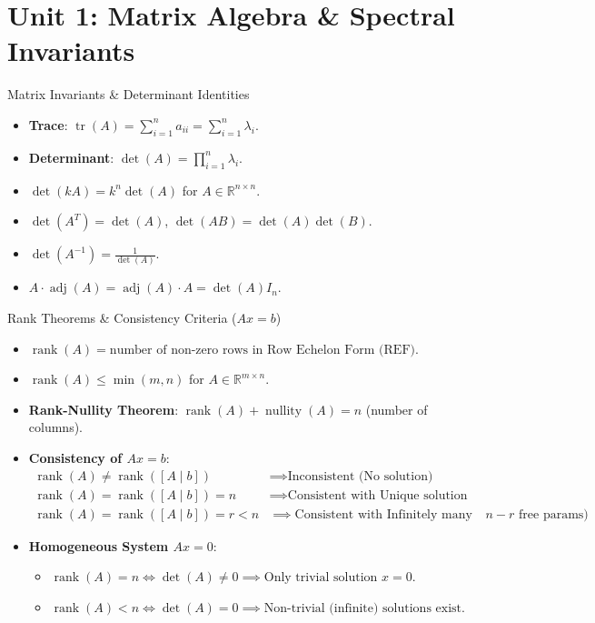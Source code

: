 \chapter{Unit 1: Matrix Algebra \& Spectral Invariants}

\begin{formulabox}{Matrix Invariants \& Determinant Identities}
\begin{itemize}
    \item \textbf{Trace}: $\operatorname{tr}(A) = \sum_{i=1}^n a_{ii} = \sum_{i=1}^n \lambda_i$.
    \item \textbf{Determinant}: $\det(A) = \prod_{i=1}^n \lambda_i$.
    \item $\det(kA) = k^n \det(A)$ for $A \in \mathbb{R}^{n \times n}$.
    \item $\det(A^T) = \det(A)$, $\det(AB) = \det(A)\det(B)$.
    \item $\det(A^{-1}) = \frac{1}{\det(A)}$.
    \item $A \cdot \operatorname{adj}(A) = \operatorname{adj}(A) \cdot A = \det(A) I_n$.
\end{itemize}
\end{formulabox}

\begin{formulabox}{Rank Theorems \& Consistency Criteria ($Ax = b$)}
\begin{itemize}
    \item $\operatorname{rank}(A) = \text{number of non-zero rows in Row Echelon Form (REF)}$.
    \item $\operatorname{rank}(A) \le \min(m, n)$ for $A \in \mathbb{R}^{m \times n}$.
    \item \textbf{Rank-Nullity Theorem}: $\operatorname{rank}(A) + \operatorname{nullity}(A) = n$ (number of columns).
    \item \textbf{Consistency of $Ax = b$}:
    \begin{align*}
        \operatorname{rank}(A) \neq \operatorname{rank}([A \mid b]) &\implies \text{Inconsistent (No solution)} \\
        \operatorname{rank}(A) = \operatorname{rank}([A \mid b]) = n &\implies \text{Consistent with Unique solution} \\
        \operatorname{rank}(A) = \operatorname{rank}([A \mid b]) = r < n &\implies \text{Consistent with Infinitely many solutions ($n - r$ free params)}
    \end{align*}
    \item \textbf{Homogeneous System $Ax = 0$}:
    \begin{itemize}
        \item $\operatorname{rank}(A) = n \iff \det(A) \neq 0 \implies \text{Only trivial solution } x = 0$.
        \item $\operatorname{rank}(A) < n \iff \det(A) = 0 \implies \text{Non-trivial (infinite) solutions exist}$.
    \end{itemize}
\end{itemize}
\end{formulabox}

